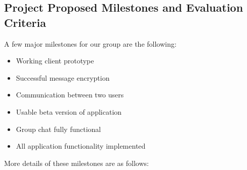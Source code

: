 \documentclass[11pt]{article}
\begin{document}
\subsection{Project Proposed Milestones and Evaluation Criteria}
A few major milestones for our group are the following:
\begin{itemize}
	\item{Working client prototype}
	\item{Successful message encryption}
	\item{Communication between two users}
	\item{Usable beta version of application}
	\item{Group chat fully functional}
	\item{All application functionality implemented}
\end{itemize}

More details of these milestones are as follows:
\end{document}
